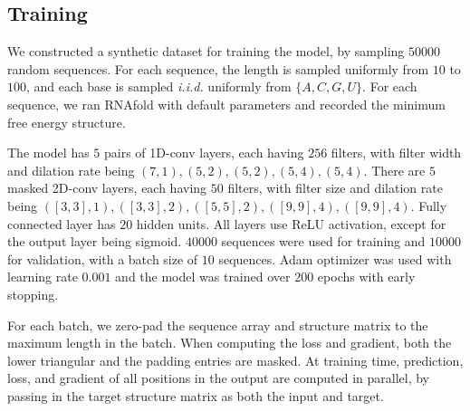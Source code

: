 \documentclass{article}
\begin{document}


\subsection{Training}

We constructed a synthetic dataset for training the model, by sampling $50000$ random sequences.
For each sequence, the length is sampled uniformly from $10$ to $100$,
and each base is sampled \textit{i.i.d.} uniformly from $\{A, C, G, U\}$.
For each sequence, we ran RNAfold\cite{lorenz2011viennarna} with default parameters and
recorded the minimum free energy structure.

The model has $5$ pairs of 1D-conv layers, each having $256$ filters, with filter width and dilation rate being
$(7,1), (5,2), (5,2), (5,4), (5,4)$.
There are $5$ masked 2D-conv layers, each having $50$ filters, with filter size and dilation rate being
$([3,3],1), ([3,3],2), ([5,5],2), ([9,9],4), ([9,9],4)$.
Fully connected layer has $20$ hidden units. All layers use ReLU activation, except for the output layer being sigmoid.
$40000$ sequences were used for training and $10000$ for validation, with a batch size of $10$ sequences.
Adam optimizer\cite{kingma2014adam} was used with learning rate $0.001$
and the model was trained over $200$ epochs with early stopping.


For each batch, we zero-pad the sequence array and structure matrix to the maximum length in the batch.
When computing the loss and gradient,
both the lower triangular and the padding entries are masked.
At training time, prediction, loss, and gradient of all positions in the output are computed in parallel,
by passing in the target structure matrix as both the input and target.



\end{document}
